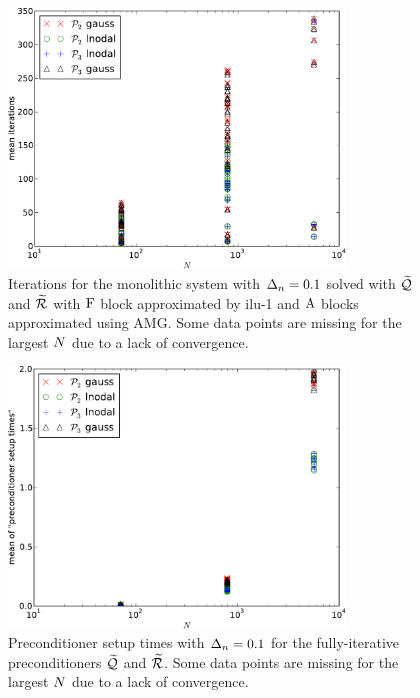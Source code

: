 \begin{figure}
  \centering
  \includegraphics[width=0.8\textwidth]{plots/linear_solvers_p2p3/implicitilu-1-meanofnsolveritersvsinitialnnode.pdf}
  \caption{Iterations for the monolithic system with $\Delta_{n}=0.1$ solved with $\widetilde{\mathcal{Q}}$ and $\widetilde{\mathcal{R}}$ with $\mathrm{F}$ block approximated by ilu-1 and $\mathrm{A}$ blocks approximated using AMG. Some data points are missing for the largest $N$ due to a lack of convergence.}
  \label{fig:its-p23-ilu1}
\end{figure}

\begin{figure}
  \centering
  \includegraphics[width=0.8\textwidth]{plots/linear_solvers_p2p3/implicitilu-1-meanofpreconditionersetuptimesvsinitialnnode.pdf}
  \caption{Preconditioner setup times with $\Delta_{n}=0.1$ for the fully-iterative preconditioners $\widetilde{\mathcal{Q}}$ and $\widetilde{\mathcal{R}}$. Some data points are missing for the largest $N$ due to a lack of convergence.}
  \label{fig:times-p23-ilu1}
\end{figure}

